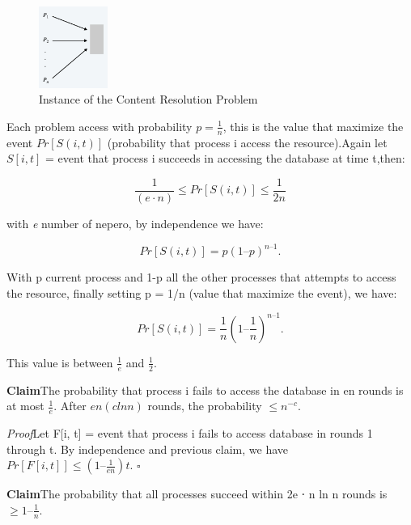 \documentclass[11pt]{article}
\newenvironment{claim}[1]{\par\textbf{Claim}\space#1}{}
\newenvironment{proof}[1]{\par\textit{Proof}\space#1}{\hfill\ensuremath{\square}}
\begin{document}
\begin{figure}[H]
		\centering
		\includegraphics[width=0.2\textwidth ]{processes}
		\caption{Instance of the Content Resolution Problem}
\end{figure}

Each problem access with probability $p=\frac{1}{n}$, this is the value that maximize the event $Pr[S(i, t)]$ (probability that process i access the resource).Again let $S[i, t]$ = event that process i succeeds in accessing the database at time t,then:

\[ \frac{1}{(e⋅n)} \leq Pr [S(i, t)] \leq \frac{1}{2n} \]

with \emph{e} number of nepero, by independence we have:

\[Pr [S(i, t)] = p(1 – p)^ {n – 1}.\]

With p current process and 1-p all the other processes that attempts to access the resource, finally setting p = 1/n (value that maximize the event), we have:

\[Pr [S(i, t)] = \frac{1}{n}(1 – \frac{1}{n})^ {n – 1}.\]

This value is between $\frac{1}{e}$ and $\frac{1}{2}$.\\

\begin{claim}
The probability that process i fails to access the database in en rounds is at most $\frac{1}{e}$. After $en (c ln n)$ rounds, the probability $\leq n^{-c}$.
\end{claim}\\

\begin{proof}
Let F[i, t] = event that process i fails to access database in rounds 1 through t. By independence and previous claim, we have $Pr [F[i, t]] \leq (1 – \frac{1}{en}) t$.
\end{proof}\\

\begin{claim}
The probability that all processes succeed within 2e ⋅ n ln n rounds is $\geq 1 – \frac{1}{n}$.
\end{claim}\\
\end{document}
